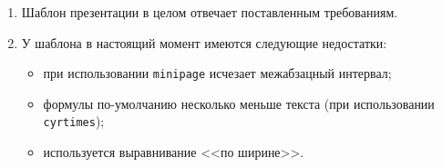 \documentclass[12pt]{article}
\begin{document}
\begin{enumerate}
\item Шаблон презентации в целом отвечает поставленным требованиям.

\item У шаблона в настоящий момент имеются следующие недостатки:
\begin{itemize}
\item при использовании \verb+minipage+ исчезает межабзацный интервал;
\item формулы по-умолчанию несколько меньше текста (при использовании \texttt{cyrtimes});
\item используется выравнивание <<по ширине>>.
\end{itemize}

\end{enumerate}
\end{document}
